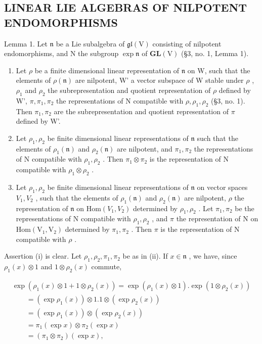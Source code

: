 \subsection{LINEAR LIE ALGEBRAS OF NILPOTENT ENDOMORPHISMS}

Lemma 1. Let \(\mathfrak{n}\) be a Lie subalgebra of \(\mathfrak{gl}(\mathrm{V})\) consisting of nilpotent endomorphisms, and \(\mathrm{N}\) the subgroup \(\exp \mathfrak{n}\) of \(\mathbf{GL}(\mathrm{V})\) (§3, no. 1, Lemma 1).

\begin{enumerate}
\def\labelenumi{(\roman{enumi})}
\item
  Let \(\rho\) be a finite dimensional linear representation of \(\mathfrak{n}\) on W, such that the elements of \(\rho(\mathfrak{n})\) are nilpotent, W' a vector subspace of W stable under \(\rho\) , \(\rho_1\) and \(\rho_2\) the subrepresentation and quotient representation of \(\rho\) defined by W', \(\pi, \pi_1, \pi_2\) the representations of N compatible with \(\rho, \rho_1, \rho_2\) (§3, no. 1). Then \(\pi_1, \pi_2\) are the subrepresentation and quotient representation of \(\pi\) defined by W'.
\item
  Let \(\rho_1, \rho_2\) be finite dimensional linear representations of \(\mathfrak{n}\) such that the elements of \(\rho_1(\mathfrak{n})\) and \(\rho_2(\mathfrak{n})\) are nilpotent, and \(\pi_1, \pi_2\) the representations of N compatible with \(\rho_1, \rho_2\) . Then \(\pi_1 \otimes \pi_2\) is the representation of N compatible with \(\rho_1 \otimes \rho_2\) .
\item
  Let \(\rho_{1},\rho_{2}\) be finite dimensional linear representations of \(\mathfrak{n}\) on vector spaces \(V_{1},V_{2}\) , such that the elements of \(\rho_1(\mathfrak{n})\) and \(\rho_{2}(\mathfrak{n})\) are nilpotent, \(\rho\) the representation of \(\mathfrak{n}\) on \(\mathrm{Hom}(V_1,V_2)\) determined by \(\rho_{1},\rho_{2}\) . Let \(\pi_1,\pi_2\) be the representations of N compatible with \(\rho_{1},\rho_{2}\) , and \(\pi\) the representation of N on \(\mathrm{Hom}(\mathrm{V}_1,\mathrm{V}_2)\) determined by \(\pi_1,\pi_2\) . Then \(\pi\) is the representation of N compatible with \(\rho\) .
\end{enumerate}

Assertion (i) is clear. Let \(\rho_1, \rho_2, \pi_1, \pi_2\) be as in (ii). If \(x \in \mathfrak{n}\) , we have, since \(\rho_1(x) \otimes 1\) and \(1 \otimes \rho_2(x)\) commute,

\[
\begin{array}{l} \exp (\rho_ {1} (x) \otimes 1 + 1 \otimes \rho_ {2} (x)) = \exp (\rho_ {1} (x) \otimes 1). \exp (1 \otimes \rho_ {2} (x)) \\ \qquad = (\exp \rho_ {1} (x)) \otimes 1. 1 \otimes (\exp \rho_ {2} (x)) \\ \qquad = (\exp \rho_ {1} (x)) \otimes (\exp \rho_ {2} (x)) \\ \qquad = \pi_ {1} (\exp x) \otimes \pi_ {2} (\exp x) \\ \qquad = (\pi_ {1} \otimes \pi_ {2}) (\exp x), \end{array}
\]

